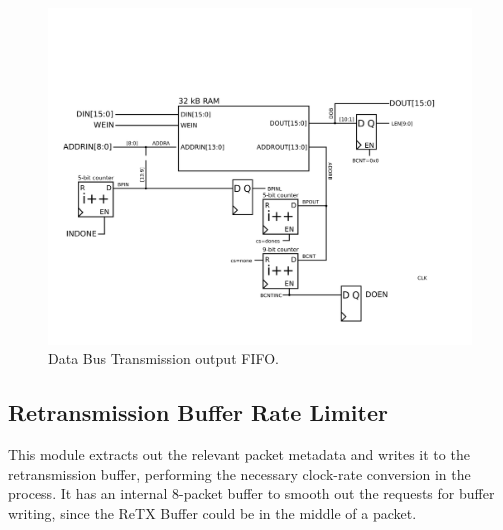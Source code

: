 \begin{figure}
\begin{centering}
\includegraphics[scale=0.8]{data.outputfifo.svg}
\end{centering}
\caption{Data Bus Transmission output FIFO.}
\label{data.outputfifo}
\end{figure}

\subsection{Retransmission Buffer Rate Limiter}
This module extracts out the relevant packet metadata and writes it to
the retransmission buffer, performing the necessary clock-rate
conversion in the process. It has an internal 8-packet buffer to
smooth out the requests for buffer writing, since the ReTX Buffer
could be in the middle of a packet.


